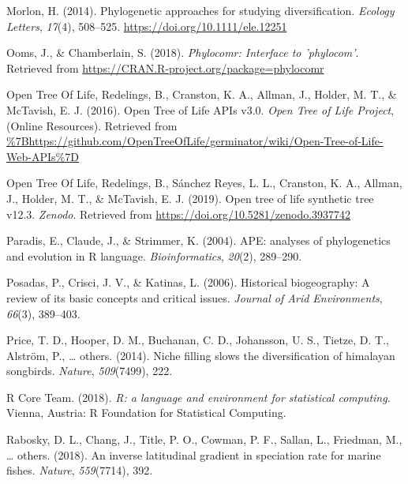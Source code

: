 \documentclass[
  english,
  man]{apa6}
\newlength{\cslhangindent}
\newlength{\cslentryspacingunit} %
\newenvironment{CSLReferences}[2] %
 {%
  \setlength{\parindent}{0pt}
  \ifodd #1
  \let\oldpar\par
  \def\par{\hangindent=\cslhangindent\oldpar}
  \fi
  \setlength{\parskip}{#2\cslentryspacingunit}
 }%
 {}
\begin{document}
\begin{CSLReferences}{1}{0}
\leavevmode{}%
Morlon, H. (2014). {Phylogenetic approaches for studying diversification.} \emph{{Ecology Letters}}, \emph{17}(4), 508--525. \url{https://doi.org/10.1111/ele.12251}

\leavevmode{}%
Ooms, J., \& Chamberlain, S. (2018). \emph{Phylocomr: Interface to 'phylocom'}. Retrieved from \url{https://CRAN.R-project.org/package=phylocomr}

\leavevmode{}%
Open Tree Of Life, Redelings, B., Cranston, K. A., Allman, J., Holder, M. T., \& McTavish, E. J. (2016). {Open Tree of Life APIs v3.0}. \emph{{Open Tree of Life Project}}, (Online Resources). Retrieved from \url{\%7Bhttps://github.com/OpenTreeOfLife/germinator/wiki/Open-Tree-of-Life-Web-APIs\%7D}

\leavevmode{}%
Open Tree Of Life, Redelings, B., Sánchez Reyes, L. L., Cranston, K. A., Allman, J., Holder, M. T., \& McTavish, E. J. (2019). Open tree of life synthetic tree v12.3. \emph{Zenodo}. Retrieved from \url{https://doi.org/10.5281/zenodo.3937742}

\leavevmode{}%
Paradis, E., Claude, J., \& Strimmer, K. (2004). {APE: analyses of phylogenetics and evolution in R language}. \emph{Bioinformatics}, \emph{20}(2), 289--290.

\leavevmode{}%
Posadas, P., Crisci, J. V., \& Katinas, L. (2006). Historical biogeography: A review of its basic concepts and critical issues. \emph{{Journal of Arid Environments}}, \emph{66}(3), 389--403.

\leavevmode{}%
Price, T. D., Hooper, D. M., Buchanan, C. D., Johansson, U. S., Tietze, D. T., Alström, P., \ldots{} others. (2014). Niche filling slows the diversification of himalayan songbirds. \emph{Nature}, \emph{509}(7499), 222.

\leavevmode{}%
R Core Team. (2018). \emph{{R: a language and environment for statistical computing}}. Vienna, Austria: R Foundation for Statistical Computing.

\leavevmode{}%
Rabosky, D. L., Chang, J., Title, P. O., Cowman, P. F., Sallan, L., Friedman, M., \ldots{} others. (2018). An inverse latitudinal gradient in speciation rate for marine fishes. \emph{Nature}, \emph{559}(7714), 392.


\end{CSLReferences}
\end{document}
